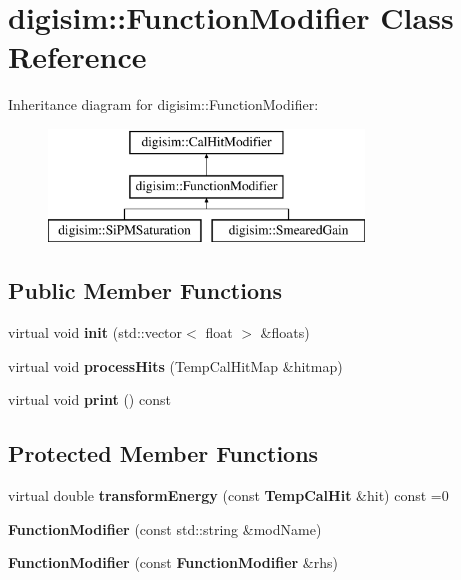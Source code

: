 \section{digisim\-:\-:Function\-Modifier Class Reference}
\label{classdigisim_1_1FunctionModifier}
Inheritance diagram for digisim\-:\-:Function\-Modifier\-:\begin{figure}[H]
\begin{center}
\leavevmode
\includegraphics[height=3.000000cm]{classdigisim_1_1FunctionModifier}
\end{center}
\end{figure}
\subsection*{Public Member Functions}
\begin{DoxyCompactItemize}
\item 
virtual void {\bfseries init} (std\-::vector$<$ float $>$ \&floats)\label{classdigisim_1_1FunctionModifier_a096c2d2085e8ff8bc2f98de9af050332}

\item 
virtual void {\bfseries process\-Hits} (Temp\-Cal\-Hit\-Map \&hitmap)\label{classdigisim_1_1FunctionModifier_aaede6212f01bbb24472bdc7d30367d76}

\item 
virtual void {\bfseries print} () const \label{classdigisim_1_1FunctionModifier_a2a3a92b64b708286a4f37df6cbaece55}

\end{DoxyCompactItemize}
\subsection*{Protected Member Functions}
\begin{DoxyCompactItemize}
\item 
virtual double {\bfseries transform\-Energy} (const {\bf Temp\-Cal\-Hit} \&hit) const =0\label{classdigisim_1_1FunctionModifier_a6736a5a7ff1061b996e60f4363d9b4e4}

\item 
{\bfseries Function\-Modifier} (const std\-::string \&mod\-Name)\label{classdigisim_1_1FunctionModifier_a30e10898d170a7dec4cef34ebb1aca23}

\item 
{\bfseries Function\-Modifier} (const {\bf Function\-Modifier} \&rhs)\label{classdigisim_1_1FunctionModifier_a877cca17f351b27d1e1636b8c990f41b}

\end{DoxyCompactItemize}
